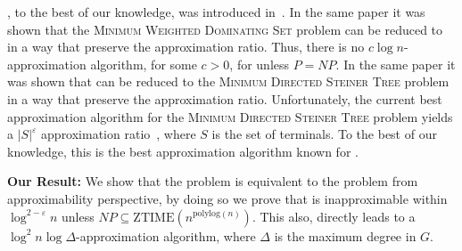 \Prob{}, to the best of our knowledge, was introduced in~\cite{shin2010approximation}.
In the same paper it was shown that the \textsc{Minimum Weighted Dominating Set} problem 
can be reduced to \Prob{} in a way that preserve the approximation ratio.
Thus, there is no $c\log n$-approximation algorithm, for some $c > 0$, for \Prob{}
unless $P = NP$.
In the same paper it was shown that \Prob{} can be reduced to the 
\textsc{Minimum Directed Steiner Tree} problem in a way that preserve the approximation ratio.
Unfortunately, the current best approximation algorithm for the 
\textsc{Minimum Directed Steiner Tree} problem yields a $|S|^\varepsilon$ 
approximation ratio~\cite{charikar1999approximation},
where $S$ is the set of terminals.
To the best of our knowledge, this is the best approximation algorithm known for \Prob{}.

\textbf{Our Result:}
We show that the \Problem{} problem is equivalent to the \ProblemGroup{} problem
from approximability perspective, 
by doing so we prove that \Prob{} is inapproximable within $\log^{2 - \varepsilon} n$   
unless $NP \subseteq \text{ZTIME}(n^{\text{polylog}(n)})$.
This also, directly leads to a $\log^2 n \log \Delta$-approximation algorithm, 
where $\Delta$ is the maximum degree in $G$.
